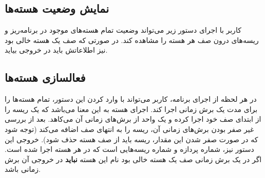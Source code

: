 \documentclass{utap}
\begin{document}
	\linespread{1.6}
	\begin{latin}%
		\centering
		\begin{minipage}[t]{1\textwidth}
			{}
			{}
			{}
			{}
		\end{minipage}%
	\end{latin}

	\subsection{نمایش وضعیت هسته‌ها}
	\hspace{5mm}
	کاربر با اجرای دستور زیر می‌تواند وضعیت تمام هسته‌های موجود در برنامه‌ریز و ریسه‌های درون صف هر هسته را مشاهده کند. در صورتی که صف یک هسته‌ خالی بود نیز اطلاعاتش باید در خروجی بیاید.
	
	\linespread{1.6}
	\begin{latin}%
		\centering
		\begin{minipage}[t]{1\textwidth}
			{}
			{}
			{}
		\end{minipage}%
	\end{latin}

	\subsection{فعالسازی هسته‌ها}
	\hspace{5mm}
	در هر لحظه از اجرای برنامه، کاربر می‌تواند با وارد کردن این دستور، تمام هسته‌ها را برای مدت یک برش زمانی اجرا کند. اجرای هسته به این معنا می‌باشد که یک ریسه‌ را از ابتدای صف خود  اجرا کرده و یک واحد از برش‌های زمانی آن می‌کاهد. بعد از بررسی غیر صفر بودن برش‌های زمانی آن، ریسه را به انتهای صف اضافه می‌کند (توجه شود که در صورت صفر شدن این مقدار،‌ ریسه باید از صف هسته حذف شود).
	خروجی این دستور نیز، شماره پردازه و شماره ریسه‌هایی است که در هر هسته اجرا شده است. اگر در یک برش زمانی صف یک هسته خالی بود نام این هسته\textbf{ نباید} در خروجی آن برش زمانی باشد.
	
\end{document}

